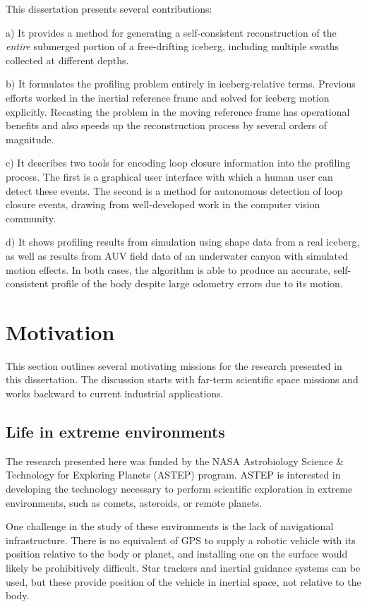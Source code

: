 This dissertation presents several contributions: 

a) It provides a method for generating a self-consistent reconstruction of the \emph{entire} submerged portion of a free-drifting iceberg, including multiple swaths collected at different depths. 

b) It formulates the profiling problem entirely in iceberg-relative terms. Previous efforts worked in the inertial reference frame and solved for iceberg motion explicitly. Recasting the problem in the moving reference frame has operational benefits and also speeds up the reconstruction process by several orders of magnitude. 

c) It describes two tools for encoding loop closure information into the profiling process. The first is a graphical user interface with which a human user can detect these events. The second is a method for autonomous detection of loop closure events, drawing from well-developed work in the computer vision community.

d) It shows profiling results from simulation using shape data from a real iceberg, as well as results from AUV field data of an underwater canyon with simulated motion effects. In both cases, the algorithm is able to produce an accurate, self-consistent profile of the body despite large odometry errors due to its motion.  



\section{Motivation}

This section outlines several motivating missions for the research presented in this dissertation. The discussion starts with far-term scientific space missions and works backward to current industrial applications.

\subsection{Life in extreme environments}

The research presented here was funded by the NASA Astrobiology Science \& Technology for Exploring Planets (ASTEP) program. ASTEP is interested in developing the technology necessary to perform scientific  exploration in extreme environments, such as comets, asteroids, or remote planets.

One challenge in the study of these environments is the lack of navigational infrastructure. There is no equivalent of GPS to supply a robotic vehicle with its position relative to the body or planet, and installing one on the surface would likely be prohibitively difficult. Star trackers and inertial guidance systems can be used, but these provide position of the vehicle in inertial space, not relative to the body.


